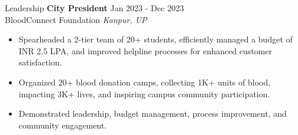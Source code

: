 \documentclass{resume} %
\begin{document}
\begin{rSection}{Leadership}
\textbf{City President} \hfill Jan 2023 - Dec 2023\\
BloodConnect Foundation \hfill \textit{Kanpur, UP}
\begin{itemize}[noitemsep]
    \item Spearheaded a 2-tier team of 20+ students, efficiently managed a budget of INR 2.5 LPA, and improved helpline processes for enhanced customer satisfaction.
    \item Organized 20+ blood donation camps, collecting 1K+ units of blood, impacting 3K+ lives, and inspiring campus community participation.
    \item Demonstrated leadership, budget management, process improvement, and community engagement.
\end{itemize}
\end{rSection}


\end{document}
